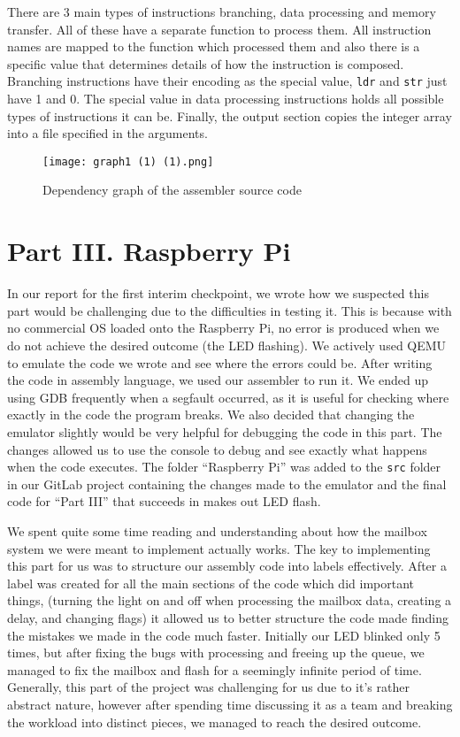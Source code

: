 \documentclass[11pt, oneside, UKenglish]{article}
\begin{document}
There are 3 main types of instructions branching, data processing and memory transfer.
All of these have a separate function to process them.
All instruction names are mapped to the function which processed them and also there is a specific value that determines details of how the instruction is composed.
Branching instructions have their encoding as the special value, \verb|ldr| and \verb|str| just have 1 and 0.
The special value in data processing instructions holds all possible types of instructions it can be.
Finally, the output section copies the integer array into a file specified in the arguments. 
\begin{figure}[H] %
    \centering
    \texttt{[image: graph1 (1) (1).png]}
    \caption{Dependency graph of the assembler source code}
    \label{fig:dependency-graph}
\end{figure}

\section{Part III. Raspberry Pi}
In our report for the first interim checkpoint, we wrote how we suspected this part would be challenging due to the difficulties in testing it.
This is because with no commercial OS loaded onto the Raspberry Pi, no error is produced when we do not achieve the desired outcome (the LED flashing).
We actively used QEMU to emulate the code we wrote and see where the errors could be.
After writing the code in assembly language, we used our assembler to run it. We ended up using GDB frequently when a segfault occurred, as it is useful for checking where exactly in the code the program breaks.
We also decided that changing the emulator slightly would be very helpful for debugging the code in this part.
The changes allowed us to use the console to debug and see exactly what happens when the code executes. The folder \enquote{Raspberry Pi} was added to the \verb|src| folder in our GitLab project containing the changes made to the emulator and the final code for \enquote{Part III} that succeeds in makes out LED flash.

We spent quite some time reading and understanding about how the mailbox system we were meant to implement actually works.
The key to implementing this part for us was to structure our assembly code into labels effectively.
After a label was created for all the main sections of the code which did important things, (turning the light on and off when processing the mailbox data, creating a delay, and changing flags) it allowed us to better structure the code made finding the mistakes we made in the code much faster.
Initially our LED blinked only 5 times, but after fixing the bugs with processing and freeing up the queue, we managed to fix the mailbox and flash for a seemingly infinite period of time.
Generally, this part of the project was challenging for us due to it's rather abstract nature, however after spending time discussing it as a team and breaking the workload into distinct pieces, we managed to reach the desired outcome.
\end{document}
